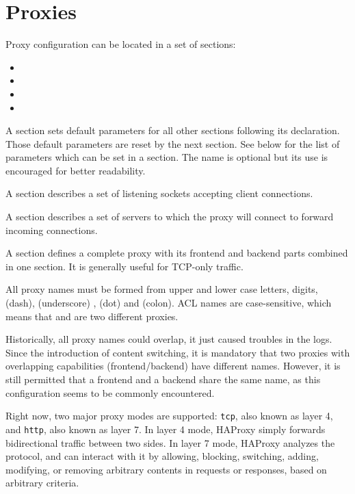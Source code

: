 
\chapter{Proxies}

Proxy configuration can be located in a set of sections:
\begin{itemize}
\item {} 
\item {} 
\item {}  
\item {}   
\end{itemize}

A  section sets default parameters for all other sections following
its declaration. Those default parameters are reset by the next 
section. See below for the list of parameters which can be set in a 
section. The name is optional but its use is encouraged for better readability.


A  section describes a set of listening sockets accepting client
connections.


A  section describes a set of servers to which the proxy will connect
to forward incoming connections.


A  section defines a complete proxy with its frontend and backend
parts combined in one section. It is generally useful for TCP-only traffic.


All proxy names must be formed from upper and lower case letters, digits,
\CHAR{-} (dash), \CHAR{\_} (underscore) ,  (dot) and \CHAR{:} (colon). ACL names are
case-sensitive, which means that  and  are two different proxies.


Historically, all proxy names could overlap, it just caused troubles in the
logs. Since the introduction of content switching, it is mandatory that two
proxies with overlapping capabilities (frontend/backend) have different names.
However, it is still permitted that a frontend and a backend share the same
name, as this configuration seems to be commonly encountered.


Right now, two major proxy modes are supported: \texttt{tcp}, also known as layer 4,
and \texttt{http}, also known as layer 7. In layer 4 mode, HAProxy simply forwards
bidirectional traffic between two sides. In layer 7 mode, HAProxy analyzes the
protocol, and can interact with it by allowing, blocking, switching, adding,
modifying, or removing arbitrary contents in requests or responses, based on
arbitrary criteria.

